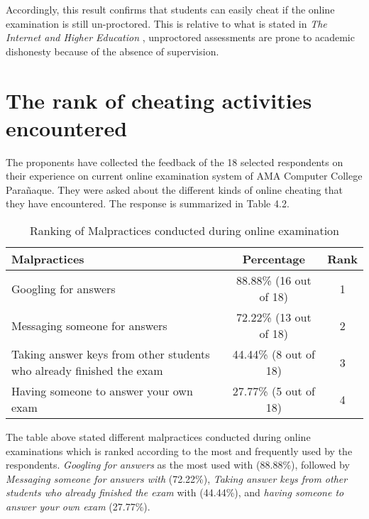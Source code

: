 Accordingly, this result confirms that students can easily cheat if the online examination is still un-proctored.
This is relative to what is stated in \emph{The Internet and Higher Education} \cite{arnold2016cheating}, unproctored assessments are prone to academic dishonesty because of the absence of supervision.

\section{The rank of cheating activities encountered}

The proponents have collected the feedback of the 18 selected respondents on their experience on current online examination system of AMA Computer College Parañaque.
They were asked about the different kinds of online cheating that they have encountered.
The response is summarized in Table 4.2.

\begin{table}[h!]
   \begin{center}
      \begin{tabular}{|m{20em}|c|c|}
         \hline
         \textbf{Malpractices}                                                & \textbf{Percentage}    & \textbf{Rank} \\
         \hline
         Googling for answers                                                 & 88.88\% (16 out of 18) & 1             \\
         \hline
         Messaging someone for answers                                        & 72.22\% (13 out of 18) & 2             \\
         \hline
         Taking answer keys from other students who already finished the exam & 44.44\% (8 out of 18)  & 3             \\
         \hline
         Having someone to answer your own exam                               & 27.77\% (5 out of 18)  & 4             \\
         \hline
      \end{tabular}
   \end{center}
   \caption{Ranking of Malpractices conducted during online examination}
\end{table}

The table above stated different malpractices conducted during online examinations which is ranked according to the most and frequently used by the respondents.
\emph{Googling for answers} as the most used with (88.88\%), followed by \emph{Messaging someone for answers with} (72.22\%), \emph{Taking answer keys from other students who already finished the exam} with (44.44\%), and \emph{having someone to answer your own exam} (27.77\%).

